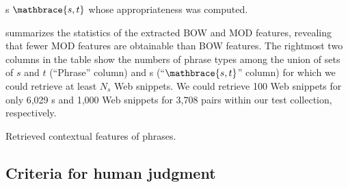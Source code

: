 \documentclass[english]{jnlp_1.4}
\begin{document}
\begin{table}[t]
\caption{{\Pcp}s $\mathbrace{s,t}$ whose appropriateness was
  computed.}
\label{tab:computed}

\end{table}

 summarizes the statistics of the extracted BOW and MOD
features, revealing that fewer MOD features are obtainable than BOW
features.
The rightmost two columns in the table show the numbers of phrase
types among the union of sets of $s$ and $t$ (``Phrase'' column) and
{\pcp}s (``$\mathbrace{s,t}$'' column) for which we could retrieve at
least $N_{s}$ Web snippets.
We could retrieve 100 Web snippets for only 6,029 {\pcp}s and 1,000
Web snippets for 3,708 pairs within our test collection,
respectively.

\begin{table}[t]
\caption{Retrieved contextual features of phrases.}
\label{tab:pfp}

\vspace{-1\baselineskip}
\end{table}


\subsection{Criteria for human judgment}
\label{ssec:judge}
\end{document}
